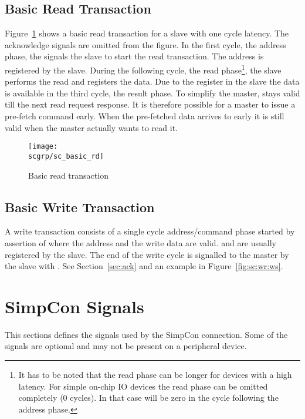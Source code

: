 \subsection{Basic Read Transaction}

Figure~\ref{fig:sc:basic:rd} shows a basic read transaction for
a slave with one cycle latency. The acknowledge signals are
omitted from the figure. In the first cycle, the address phase,
the  signals the slave to start the read transaction.
The address is registered by the slave. During the following
cycle, the read phase\footnote{It has to be noted that the read
phase can be longer for devices with a high latency. For simple
on-chip IO devices the read phase can be omitted completely (0
cycles). In that case  will be zero in the cycle
following the address phase.}, the slave performs the read and
registers the data. Due to the register in the slave the data
is available in the third cycle, the result phase. To simplify
the master,  stays valid till the next read
request response. It is therefore possible for a master to
issue a pre-fetch command early. When the pre-fetched data
arrives to early it is still valid when the master actually
wants to read it.

\begin{figure}
    \centering
    \texttt{[image: \\scgrp/sc\_basic\_rd]}
    \caption{Basic read transaction}
    \label{fig:sc:basic:rd}
\end{figure}

\subsection{Basic Write Transaction}

A write transaction consists of a single cycle address/command phase
started by assertion of  where the address and the write
data are valid.  and  are usually
registered by the slave. The end of the write cycle is signalled to
the master by the slave with . See
Section~\ref{sec:ack} and an example in Figure~\ref{fig:sc:wr:ws}.

\section{SimpCon Signals}

This sections defines the signals used by the SimpCon connection.
Some of the signals are optional and may not be present on a
peripheral device.

